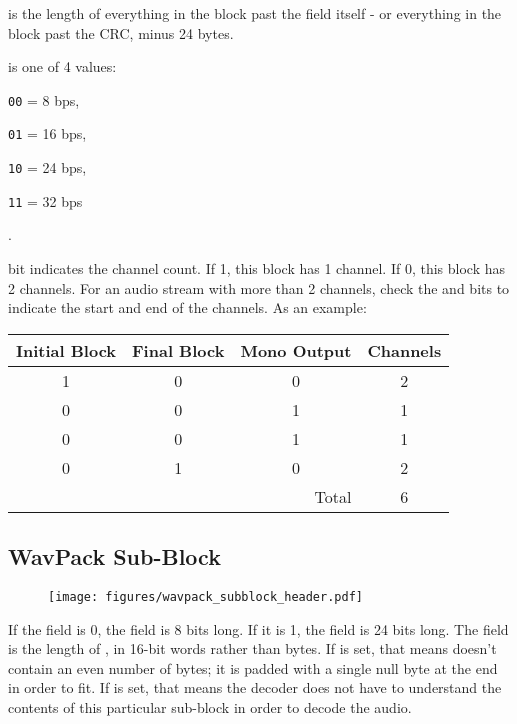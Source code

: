  is the length of everything in the block past
the  field itself -
or everything in the block past the CRC, minus 24 bytes.

 is one of 4 values:

\begin{inparaenum}
\item[\texttt{00} = ] 8 bps,
\item[\texttt{01} = ] 16 bps,
\item[\texttt{10} = ] 24 bps,
\item[\texttt{11} = ] 32 bps
\end{inparaenum}
.

 bit indicates the channel count.
If 1, this block has 1 channel.
If 0, this block has 2 channels.
For an audio stream with more than 2 channels,
check the  and  bits to indicate
the start and end of the channels.  As an example:

\begin{tabular}{c|c|c|c}
Initial Block & Final Block & Mono Output & Channels \\
\hline
1 & 0 & 0 & 2 \\
0 & 0 & 1 & 1 \\
0 & 0 & 1 & 1 \\
0 & 1 & 0 & 2 \\
\hline
\multicolumn{3}{r|}{Total} & 6
\end{tabular}

\clearpage

\subsection{WavPack Sub-Block}
\begin{figure}[h]
\texttt{[image: figures/wavpack\_subblock\_header.pdf]}
\end{figure}
\par
\noindent
If the  field is 0, the  field is 8 bits long.
If it is 1, the  field is 24 bits long.
The  field is the length of , in 16-bit
words rather than bytes.
If  is set, that means  doesn't contain
an even number of bytes; it is padded with a single null byte at the
end in order to fit.
If  is set, that means the decoder does not have
to understand the contents of this particular sub-block in
order to decode the audio.


